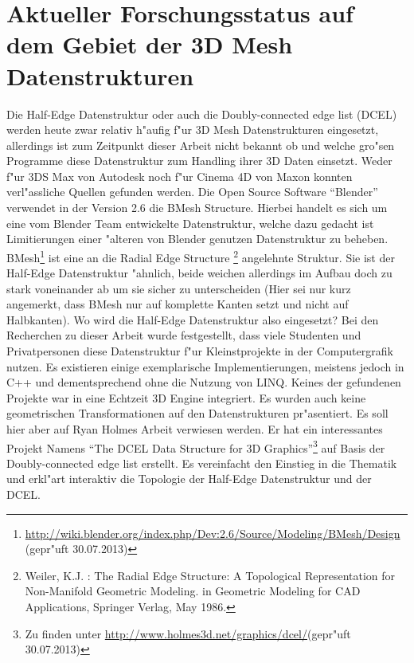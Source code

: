 \documentclass[pagesize, paper=a4, fontsize=12pt,titlepage=true, headings=small, headnosepline, abstractoff, liststotoc, nochapterprefix, plainheadsepline]{scrreprt}
\newcommand{\HES}{Half-Edge Datenstruktur }
\begin{document}
	\section {Aktueller Forschungsstatus auf dem Gebiet der 3D Mesh Datenstrukturen}
		Die \HES oder auch die Doubly-connected edge list (DCEL) werden heute zwar relativ h"aufig f"ur 3D Mesh Datenstrukturen eingesetzt, allerdings ist zum Zeitpunkt dieser Arbeit nicht bekannt ob und welche gro"sen Programme diese Datenstruktur zum Handling ihrer 3D Daten einsetzt. Weder f"ur 3DS Max von Autodesk noch f"ur Cinema 4D von Maxon konnten verl"assliche Quellen gefunden werden. Die Open Source Software "`Blender"' verwendet in der Version 2.6 die BMesh Structure. Hierbei handelt es sich um eine vom Blender Team entwickelte Datenstruktur, welche dazu gedacht ist Limitierungen einer "alteren von Blender genutzen Datenstruktur zu beheben. BMesh\footnote{\url{http://wiki.blender.org/index.php/Dev:2.6/Source/Modeling/BMesh/Design} (gepr"uft 30.07.2013)}  ist eine an die Radial Edge Structure \footnote{Weiler, K.J. : The Radial Edge Structure: A Topological Representation for Non-Manifold Geometric Modeling. in Geometric Modeling for CAD Applications, Springer Verlag, May 1986.} angelehnte Struktur. Sie ist der \HES "ahnlich, beide weichen allerdings im Aufbau doch zu stark voneinander ab um sie sicher zu unterscheiden (Hier sei nur kurz angemerkt, dass BMesh nur auf komplette Kanten setzt und nicht auf Halbkanten). Wo wird die \HES also eingesetzt? Bei den Recherchen zu dieser Arbeit wurde festgestellt, dass viele Studenten und Privatpersonen diese Datenstruktur f"ur Kleinstprojekte in der Computergrafik nutzen. Es existieren einige exemplarische Implementierungen, meistens jedoch in C++ und dementsprechend ohne die Nutzung von LINQ. Keines der gefundenen Projekte war in eine Echtzeit 3D Engine integriert. Es wurden auch keine geometrischen Transformationen auf den Datenstrukturen pr"asentiert. Es soll hier aber auf Ryan Holmes Arbeit \cite{Holmes.2012} verwiesen werden. Er hat ein interessantes Projekt Namens "`The DCEL Data Structure for 3D Graphics"'\footnote{Zu finden unter \url{http://www.holmes3d.net/graphics/dcel/}(gepr"uft 30.07.2013)} auf Basis der Doubly-connected edge list erstellt. Es vereinfacht den Einstieg in die Thematik und erkl"art interaktiv die Topologie der \HES und der DCEL.
\newline
\end{document}
